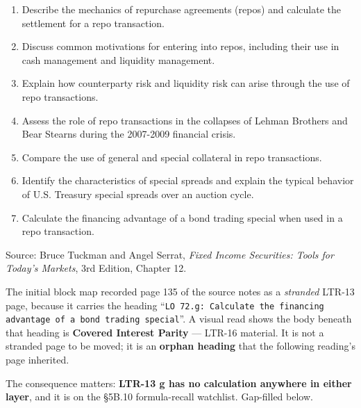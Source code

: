 
\begin{lrkeybox}
\begin{enumerate}[label=\textbf{\alph*.}]
\item Describe the mechanics of repurchase agreements (repos) and calculate the settlement for a repo transaction.
\item Discuss common motivations for entering into repos, including their use in cash management and liquidity management.
\item Explain how counterparty risk and liquidity risk can arise through the use of repo transactions.
\item Assess the role of repo transactions in the collapses of Lehman Brothers and Bear Stearns during the 2007-2009 financial crisis.
\item Compare the use of general and special collateral in repo transactions.
\item Identify the characteristics of special spreads and explain the typical behavior of U.S. Treasury special spreads over an auction cycle.
\item Calculate the financing advantage of a bond trading special when used in a repo transaction.
\end{enumerate}
{\footnotesize\color{FRMGrey}Source: Bruce Tuckman and Angel Serrat, \textit{Fixed Income Securities: Tools for Today's Markets}, 3rd Edition, Chapter 12.}
\end{lrkeybox}

\begin{lrtrapbox}
The initial block map recorded page 135 of the source notes as a \emph{stranded} LTR-13 page, because it carries the heading ``\texttt{LO 72.g: Calculate the financing advantage of a bond trading special}''. A visual read shows the body beneath that heading is \textbf{Covered Interest Parity} --- LTR-16 material. It is not a stranded page to be moved; it is an \textbf{orphan heading} that the following reading's page inherited.

The consequence matters: \textbf{LTR-13 g has no calculation anywhere in either layer}, and it is on the \S5B.10 formula-recall watchlist. Gap-filled below.
\end{lrtrapbox}


